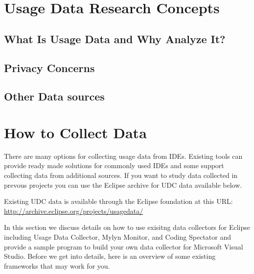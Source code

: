 
\section{Usage Data Research Concepts}

\subsection{What Is Usage Data and Why Analyze It?}


\subsection{Privacy Concerns}


\subsection{Other Data sources}



\section{How to Collect Data}
\label{SecHowToCollectData}

There are many options for collecting usage data from IDEs.   Existing tools can provide ready made solutions for commonly used IDEs and some support collecting data from additional sources.   If you want to study data collected in prevous projects you can use the Eclipse archive for UDC data available below.


Existing UDC data is available through the Eclipse foundation at this URL:
\url{http://archive.eclipse.org/projects/usagedata/}


In this section we discuss details on how to use exisitng data collectors for Eclipse including Usage Data Collector, Mylyn Monitor, and Coding Spectator and provide a sample program to build your own data collector for Microsoft Visual Studio.  Before we get into details, here is an overview of some existing frameworks that may work for you.

